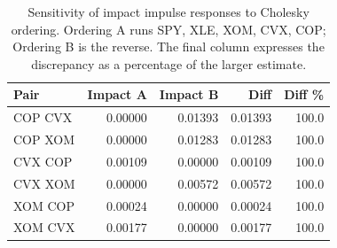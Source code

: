 \begin{table}[htbp]
\centering
\caption{Sensitivity of impact impulse responses to Cholesky ordering. Ordering A runs SPY, XLE, XOM, CVX, COP; Ordering B is the reverse. The final column expresses the discrepancy as a percentage of the larger estimate.} 
\label{tab:irf_sensitivity}
\begin{tabular}{lrrrr}
  \toprule
Pair & Impact A & Impact B & Diff & Diff \% \\ 
  \midrule
COP \textrightarrow{} CVX & 0.00000 & 0.01393 & 0.01393 & 100.0 \\ 
  COP \textrightarrow{} XOM & 0.00000 & 0.01283 & 0.01283 & 100.0 \\ 
  CVX \textrightarrow{} COP & 0.00109 & 0.00000 & 0.00109 & 100.0 \\ 
  CVX \textrightarrow{} XOM & 0.00000 & 0.00572 & 0.00572 & 100.0 \\ 
  XOM \textrightarrow{} COP & 0.00024 & 0.00000 & 0.00024 & 100.0 \\ 
  XOM \textrightarrow{} CVX & 0.00177 & 0.00000 & 0.00177 & 100.0 \\ 
   \bottomrule
\end{tabular}
\end{table}
